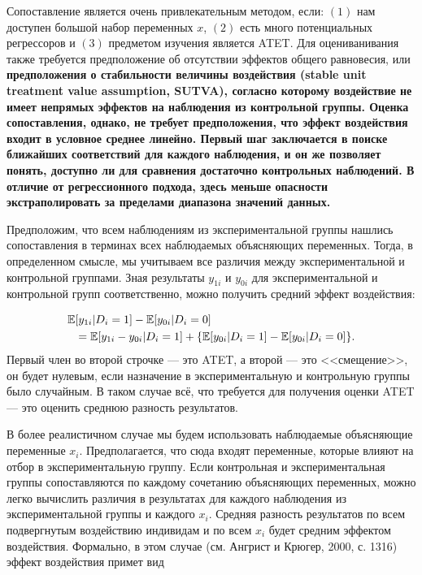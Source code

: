 Сопоставление является очень привлекательным методом, если: $(1)$ нам доступен большой набор переменных $x$, $(2)$ есть много потенциальных регрессоров и $(3)$ предметом изучения является ATET. Для оцениванивания также требуется предположение об отсутствии эффектов общего равновесия, или \bfseries предположения о стабильности величины воздействия (stable unit treatment value assumption, SUTVA), \mdseries согласно которому воздействие не имеет непрямых эффектов на наблюдения из контрольной группы. Оценка сопоставления, однако, не требует предположения, что эффект воздействия входит в условное среднее линейно. Первый шаг заключается в поиске ближайших соответствий для каждого наблюдения, и он же позволяет понять, доступно ли для сравнения достаточно контрольных наблюдений. В отличие от регрессионного подхода, здесь меньше опасности экстраполировать  за пределами диапазона значений данных. 

Предположим, что всем наблюдениям из экспериментальной группы нашлись сопоставления в терминах всех наблюдаемых объясняющих переменных. Тогда, в определенном смысле, мы учитываем все различия между экспериментальной и контрольной группами. Зная результаты $y_{1i}$ и $y_{0i}$ для экспериментальной и контрольной групп соответственно, можно получить средний эффект воздействия:

\begin{align}
\label{eq25.37}
\mathbb{E} & [y_{1i} | D_i = 1] - \mathbb{E} [y_{0i} | D_i = 0]  \\
& = \mathbb{E} [y_{1i} - y_{0i} | D_i = 1] + \{  \mathbb{E} [y_{0i} | D_i = 1] -  \mathbb{E} [y_{0i} | D_i = 0] \}. \nonumber
\end{align}
Первый член во второй строчке --- это ATET, а второй --- это <<смещение>>, он будет нулевым, если назначение в экспериментальную и контрольную группы было случайным. В таком случае всё, что требуется для получения оценки ATET --- это оценить среднюю разность результатов. 

В более реалистичном случае мы будем использовать наблюдаемые объясняющие переменные $x_i$. Предполагается, что сюда входят переменные, которые влияют на отбор в экспериментальную группу. Если контрольная и экспериментальная группы сопоставляются по каждому сочетанию объясняющих переменных, можно легко вычислить различия в результатах для каждого наблюдения из экспериментальной группы и каждого $x_i$. Средняя разность результатов по всем подвергнутым воздействию индивидам и по всем $x_i$ будет средним эффектом воздействия. Формально, в этом случае (см. Ангрист и Крюгер, 2000, с. 1316) эффект воздействия примет вид

